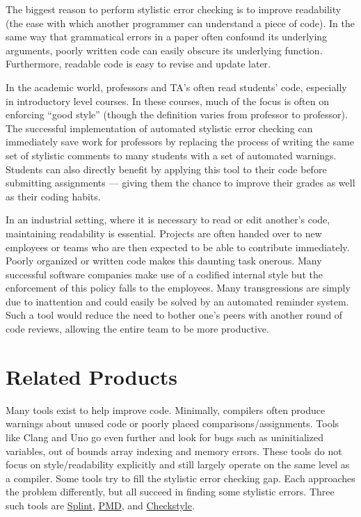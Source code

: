 \documentclass[12pt]{report}
\begin{document}
The biggest reason to perform stylistic error checking is to improve readability (the 
ease with which another programmer can understand a piece of code). In the same way that 
grammatical errors in a paper often confound its underlying arguments, poorly written code can easily 
obscure its underlying function. Furthermore, readable code is easy to revise and update later. 

In the academic world, professors and TA's often read students' code, especially in introductory level
courses. In these courses, much of the focus is often on enforcing ``good style'' (though the definition 
varies from professor to professor).  The successful implementation of automated stylistic error 
checking can immediately save work for professors by replacing the process of writing the same set of 
stylistic comments to many students with a set of automated warnings. Students can also directly 
benefit by applying this tool to their code before submitting assignments --- giving them the chance to 
improve their grades as well as their coding habits.

In an industrial setting, where it is necessary to read or edit another's code, maintaining readability is 
essential. Projects are often handed over to new employees or teams who are then expected to be 
able to contribute immediately. Poorly organized or written code makes this daunting task 
onerous. Many successful software companies make use of a codified internal style but the 
enforcement of this policy falls to the employees. Many transgressions are simply due to inattention 
and could easily be solved by an automated reminder system. Such a tool would reduce the need to 
bother one's peers with another round of code reviews, allowing the entire team to be more productive. 

\chapter{Related Products}

Many tools exist to help improve code. Minimally, compilers often produce warnings about unused code 
or poorly placed comparisons\slash assignments. Tools like Clang\cite{clang} and Uno\cite{Uno} go 
even further and look for bugs such as uninitialized variables, out of bounds array indexing and memory 
errors. These tools do not focus on style\slash readability explicitly and still largely operate on the same 
level as a compiler.  Some tools try to fill the stylistic error checking gap. Each approaches the problem 
differently, but all succeed in finding some stylistic errors. Three such tools are 
\hyperref[sec:splint]{Splint}\cite{splint-manual}, \hyperref[sec:pmdAndCheckstyle]{PMD}\cite{pmd}, and 
\hyperref[sec:pmdAndCheckstyle]{Checkstyle}\cite{checkstyle}.
\end{document}
